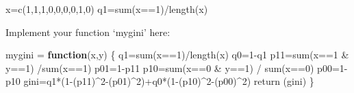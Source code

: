 \documentclass[
]{article}
\newenvironment{Shaded}{\begin{snugshade}}{\end{snugshade}}
\newcommand{\ControlFlowTok}[1]{\textcolor[rgb]{0.13,0.29,0.53}{\textbf{#1}}}
\newcommand{\DecValTok}[1]{\textcolor[rgb]{0.00,0.00,0.81}{#1}}
\newcommand{\FunctionTok}[1]{\textcolor[rgb]{0.00,0.00,0.00}{#1}}
\newcommand{\NormalTok}[1]{#1}
\newcommand{\OtherTok}[1]{\textcolor[rgb]{0.56,0.35,0.01}{#1}}
\newcommand{\SpecialCharTok}[1]{\textcolor[rgb]{0.00,0.00,0.00}{#1}}
\begin{document}
\begin{Shaded}
\begin{Highlighting}[]
\NormalTok{   x}\OtherTok{=}\FunctionTok{c}\NormalTok{(}\DecValTok{1}\NormalTok{,}\DecValTok{1}\NormalTok{,}\DecValTok{1}\NormalTok{,}\DecValTok{0}\NormalTok{,}\DecValTok{0}\NormalTok{,}\DecValTok{0}\NormalTok{,}\DecValTok{0}\NormalTok{,}\DecValTok{1}\NormalTok{,}\DecValTok{0}\NormalTok{)}
\NormalTok{   q1}\OtherTok{=}\FunctionTok{sum}\NormalTok{(x}\SpecialCharTok{==}\DecValTok{1}\NormalTok{)}\SpecialCharTok{/}\FunctionTok{length}\NormalTok{(x)}
\end{Highlighting}
\end{Shaded}

Implement your function `mygini' here:

\begin{Shaded}
\begin{Highlighting}[]
\NormalTok{mygini }\OtherTok{=} \ControlFlowTok{function}\NormalTok{(x,y) \{}
\NormalTok{  q1}\OtherTok{=}\FunctionTok{sum}\NormalTok{(x}\SpecialCharTok{==}\DecValTok{1}\NormalTok{)}\SpecialCharTok{/}\FunctionTok{length}\NormalTok{(x)}
\NormalTok{  q0}\OtherTok{=}\DecValTok{1}\SpecialCharTok{{-}}\NormalTok{q1}
\NormalTok{  p11}\OtherTok{=}\FunctionTok{sum}\NormalTok{(x}\SpecialCharTok{==}\DecValTok{1} \SpecialCharTok{\&}\NormalTok{ y}\SpecialCharTok{==}\DecValTok{1}\NormalTok{) }\SpecialCharTok{/}\FunctionTok{sum}\NormalTok{(x}\SpecialCharTok{==}\DecValTok{1}\NormalTok{)}
\NormalTok{  p01}\OtherTok{=}\DecValTok{1}\SpecialCharTok{{-}}\NormalTok{p11}
\NormalTok{  p10}\OtherTok{=}\FunctionTok{sum}\NormalTok{(x}\SpecialCharTok{==}\DecValTok{0} \SpecialCharTok{\&}\NormalTok{ y}\SpecialCharTok{==}\DecValTok{1}\NormalTok{) }\SpecialCharTok{/} \FunctionTok{sum}\NormalTok{(x}\SpecialCharTok{==}\DecValTok{0}\NormalTok{)}
\NormalTok{  p00}\OtherTok{=}\DecValTok{1}\SpecialCharTok{{-}}\NormalTok{p10}
\NormalTok{  gini}\OtherTok{=}\NormalTok{q1}\SpecialCharTok{*}\NormalTok{(}\DecValTok{1}\SpecialCharTok{{-}}\NormalTok{(p11)}\SpecialCharTok{\^{}}\DecValTok{2}\SpecialCharTok{{-}}\NormalTok{(p01)}\SpecialCharTok{\^{}}\DecValTok{2}\NormalTok{)}\SpecialCharTok{+}\NormalTok{q0}\SpecialCharTok{*}\NormalTok{(}\DecValTok{1}\SpecialCharTok{{-}}\NormalTok{(p10)}\SpecialCharTok{\^{}}\DecValTok{2}\SpecialCharTok{{-}}\NormalTok{(p00)}\SpecialCharTok{\^{}}\DecValTok{2}\NormalTok{)}
  \FunctionTok{return}\NormalTok{ (gini)}
\NormalTok{\}}
\end{Highlighting}
\end{Shaded}
\end{document}
